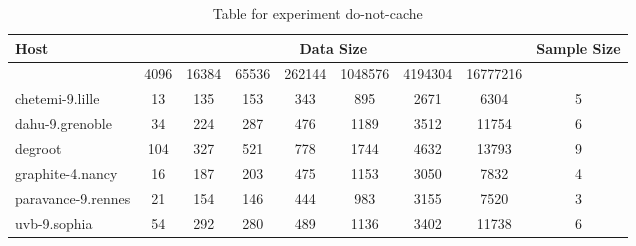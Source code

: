 \begin{table}
\caption{Table for experiment do-not-cache}
\begin{tabular}{@{}lcccccccc@{}}
\toprule
Host    & \multicolumn{7}{c}{Data Size}          & Sample Size \\ \midrule
& 4096  & 16384  & 65536  & 262144  & 1048576  & 4194304  & 16777216              \\ \midrule
chetemi-9.lille  & 13  & 135  & 153  & 343  & 895  & 2671  & 6304  & 5 \\
dahu-9.grenoble  & 34  & 224  & 287  & 476  & 1189  & 3512  & 11754  & 6 \\
degroot  & 104  & 327  & 521  & 778  & 1744  & 4632  & 13793  & 9 \\
graphite-4.nancy  & 16  & 187  & 203  & 475  & 1153  & 3050  & 7832  & 4 \\
paravance-9.rennes  & 21  & 154  & 146  & 444  & 983  & 3155  & 7520  & 3 \\
uvb-9.sophia  & 54  & 292  & 280  & 489  & 1136  & 3402  & 11738  & 6 \\
\bottomrule
\end{tabular}
\end{table}